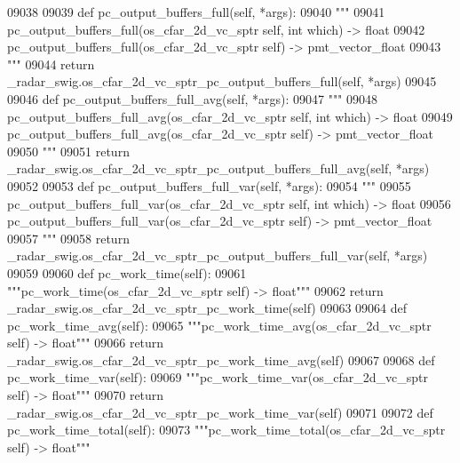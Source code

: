 \begin{DoxyCode}
{{{{{{{{{{{{{{{{{{{{{{{{{{{{{09038 
09039     \textcolor{keyword}{def }pc_output_buffers_full(self, *args):
09040         \textcolor{stringliteral}{"""}
09041 \textcolor{stringliteral}{        pc\_output\_buffers\_full(os\_cfar\_2d\_vc\_sptr self, int which) -> float}
09042 \textcolor{stringliteral}{        pc\_output\_buffers\_full(os\_cfar\_2d\_vc\_sptr self) -> pmt\_vector\_float}
09043 \textcolor{stringliteral}{        """}
09044         \textcolor{keywordflow}{return} \_radar\_swig.os\_cfar\_2d\_vc\_sptr\_pc\_output\_buffers\_full(self, *args)
09045 
09046     \textcolor{keyword}{def }pc_output_buffers_full_avg(self, *args):
09047         \textcolor{stringliteral}{"""}
09048 \textcolor{stringliteral}{        pc\_output\_buffers\_full\_avg(os\_cfar\_2d\_vc\_sptr self, int which) -> float}
09049 \textcolor{stringliteral}{        pc\_output\_buffers\_full\_avg(os\_cfar\_2d\_vc\_sptr self) -> pmt\_vector\_float}
09050 \textcolor{stringliteral}{        """}
09051         \textcolor{keywordflow}{return} \_radar\_swig.os\_cfar\_2d\_vc\_sptr\_pc\_output\_buffers\_full\_avg(self, *args)
09052 
09053     \textcolor{keyword}{def }pc_output_buffers_full_var(self, *args):
09054         \textcolor{stringliteral}{"""}
09055 \textcolor{stringliteral}{        pc\_output\_buffers\_full\_var(os\_cfar\_2d\_vc\_sptr self, int which) -> float}
09056 \textcolor{stringliteral}{        pc\_output\_buffers\_full\_var(os\_cfar\_2d\_vc\_sptr self) -> pmt\_vector\_float}
09057 \textcolor{stringliteral}{        """}
09058         \textcolor{keywordflow}{return} \_radar\_swig.os\_cfar\_2d\_vc\_sptr\_pc\_output\_buffers\_full\_var(self, *args)
09059 
09060     \textcolor{keyword}{def }pc_work_time(self):
09061         \textcolor{stringliteral}{"""pc\_work\_time(os\_cfar\_2d\_vc\_sptr self) -> float"""}
09062         \textcolor{keywordflow}{return} \_radar\_swig.os\_cfar\_2d\_vc\_sptr\_pc\_work\_time(self)
09063 
09064     \textcolor{keyword}{def }pc_work_time_avg(self):
09065         \textcolor{stringliteral}{"""pc\_work\_time\_avg(os\_cfar\_2d\_vc\_sptr self) -> float"""}
09066         \textcolor{keywordflow}{return} \_radar\_swig.os\_cfar\_2d\_vc\_sptr\_pc\_work\_time\_avg(self)
09067 
09068     \textcolor{keyword}{def }pc_work_time_var(self):
09069         \textcolor{stringliteral}{"""pc\_work\_time\_var(os\_cfar\_2d\_vc\_sptr self) -> float"""}
09070         \textcolor{keywordflow}{return} \_radar\_swig.os\_cfar\_2d\_vc\_sptr\_pc\_work\_time\_var(self)
09071 
09072     \textcolor{keyword}{def }pc_work_time_total(self):
09073         \textcolor{stringliteral}{"""pc\_work\_time\_total(os\_cfar\_2d\_vc\_sptr self) -> float"""}
}}}}}}}}}}}}}}}}}}}}}}}}}}}}}
\end{DoxyCode}
